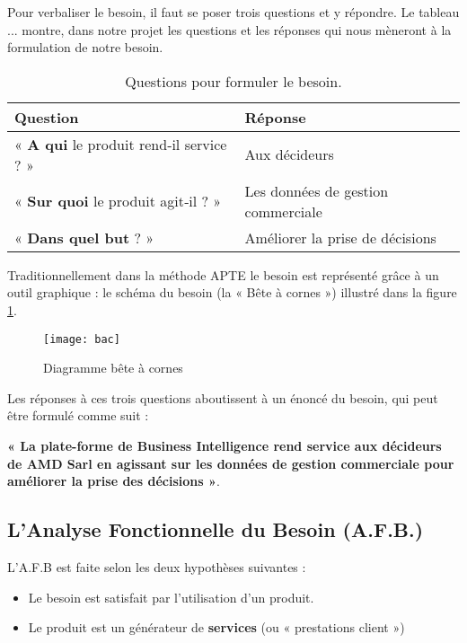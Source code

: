 Pour verbaliser le besoin, il faut se poser trois questions et y répondre. Le tableau ... montre, dans notre projet les questions et les réponses qui nous mèneront à la formulation de notre besoin.

\begin{table}[H]
    \centering
    \caption{Questions pour formuler le besoin.}
    \begin{tabular}[t]{|p{7cm}|p{8cm}|} 
        \hline
        \textbf{Question} & \textbf{Réponse}\\
        \hline\hline
        « \textbf{A qui} le produit rend‐il service ? » & Aux décideurs \\
        \hline
        « \textbf{Sur quoi} le produit agit‐il ? » & Les données de gestion commerciale \\
        \hline
        « \textbf{Dans quel but} ? » & Améliorer la prise de décisions\\
        \hline\hline
    \end{tabular}
    \label{tab:etapesaf}
\end{table}%

Traditionnellement dans la méthode APTE le besoin est représenté grâce à un outil graphique : le schéma du besoin (la « Bête à cornes ») illustré dans la figure \ref{fig:bac}.

\begin{figure}[H]
    \centering
    \texttt{[image: bac]}
    \caption{Diagramme bête à cornes}
    \label{fig:bac}
\end{figure}

Les réponses à ces trois questions aboutissent à un énoncé du besoin, qui peut être formulé comme suit :

\textbf{« La plate-forme de Business Intelligence rend service aux décideurs de AMD Sarl en agissant sur les données de gestion commerciale pour améliorer la prise des décisions »}.



\subsection{L'Analyse Fonctionnelle du Besoin (A.F.B.)}
L'A.F.B est faite selon les deux hypothèses suivantes :
\begin{itemize}
    \item Le besoin est satisfait par l’utilisation d’un produit.
    \item Le produit est un générateur de \textbf{services} (ou « prestations client »)
\end{itemize}


